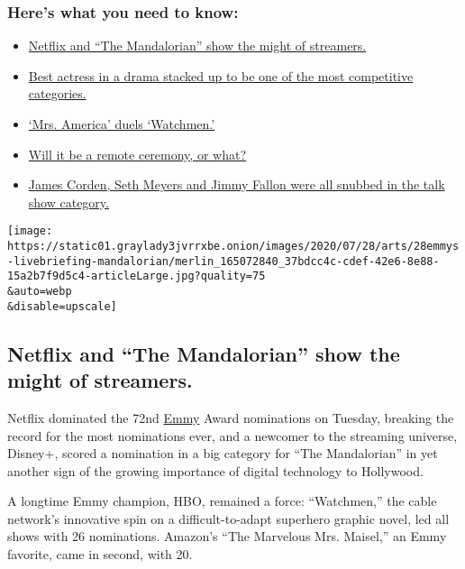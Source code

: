 \hypertarget{heres-what-you-need-to-know}{%
\subsubsection{Here's what you need to
know:}\label{heres-what-you-need-to-know}}

\begin{itemize}
\tightlist
\item
  \protect\hyperlink{link-371a3cd4}{Netflix and ``The Mandalorian'' show
  the might of streamers.}
\item
  \protect\hyperlink{link-4832be22}{Best actress in a drama stacked up
  to be one of the most competitive categories.}
\item
  \protect\hyperlink{link-70dd8295}{`Mrs. America' duels `Watchmen.'}
\item
  \protect\hyperlink{link-55c82a59}{Will it be a remote ceremony, or
  what?}
\item
  \protect\hyperlink{link-75cb73af}{James Corden, Seth Meyers and Jimmy
  Fallon were all snubbed in the talk show category.}
\end{itemize}

\texttt{[image: https://static01.graylady3jvrrxbe.onion/images/2020/07/28/arts/28emmys-livebriefing-mandalorian/merlin\_165072840\_37bdcc4c-cdef-42e6-8e88-15a2b7f9d5c4-articleLarge.jpg?quality=75\\\&auto=webp\\\&disable=upscale]}

\hypertarget{netflix-and-the-mandalorian-show-the-might-of-streamers}{%
\subsection{Netflix and ``The Mandalorian'' show the might of
streamers.}\label{netflix-and-the-mandalorian-show-the-might-of-streamers}}

Netflix dominated the 72nd
\href{https://www.nytimes3xbfgragh.onion/news-event/emmy-awards}{Emmy}
Award nominations on Tuesday, breaking the record for the most
nominations ever, and a newcomer to the streaming universe, Disney+,
scored a nomination in a big category for ``The Mandalorian'' in yet
another sign of the growing importance of digital technology to
Hollywood.

A longtime Emmy champion, HBO, remained a force: ``Watchmen,'' the cable
network's innovative spin on a difficult-to-adapt superhero graphic
novel, led all shows with 26 nominations. Amazon's ``The Marvelous Mrs.
Maisel,'' an Emmy favorite, came in second, with 20.

